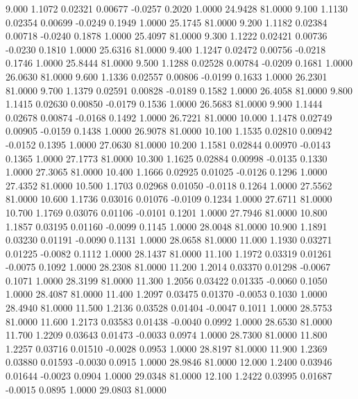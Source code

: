    9.000   1.1072   0.02321   0.00677  -0.0257   0.2020   1.0000  24.9428  81.0000
   9.100   1.1130   0.02354   0.00699  -0.0249   0.1949   1.0000  25.1745  81.0000
   9.200   1.1182   0.02384   0.00718  -0.0240   0.1878   1.0000  25.4097  81.0000
   9.300   1.1222   0.02421   0.00736  -0.0230   0.1810   1.0000  25.6316  81.0000
   9.400   1.1247   0.02472   0.00756  -0.0218   0.1746   1.0000  25.8444  81.0000
   9.500   1.1288   0.02528   0.00784  -0.0209   0.1681   1.0000  26.0630  81.0000
   9.600   1.1336   0.02557   0.00806  -0.0199   0.1633   1.0000  26.2301  81.0000
   9.700   1.1379   0.02591   0.00828  -0.0189   0.1582   1.0000  26.4058  81.0000
   9.800   1.1415   0.02630   0.00850  -0.0179   0.1536   1.0000  26.5683  81.0000
   9.900   1.1444   0.02678   0.00874  -0.0168   0.1492   1.0000  26.7221  81.0000
  10.000   1.1478   0.02749   0.00905  -0.0159   0.1438   1.0000  26.9078  81.0000
  10.100   1.1535   0.02810   0.00942  -0.0152   0.1395   1.0000  27.0630  81.0000
  10.200   1.1581   0.02844   0.00970  -0.0143   0.1365   1.0000  27.1773  81.0000
  10.300   1.1625   0.02884   0.00998  -0.0135   0.1330   1.0000  27.3065  81.0000
  10.400   1.1666   0.02925   0.01025  -0.0126   0.1296   1.0000  27.4352  81.0000
  10.500   1.1703   0.02968   0.01050  -0.0118   0.1264   1.0000  27.5562  81.0000
  10.600   1.1736   0.03016   0.01076  -0.0109   0.1234   1.0000  27.6711  81.0000
  10.700   1.1769   0.03076   0.01106  -0.0101   0.1201   1.0000  27.7946  81.0000
  10.800   1.1857   0.03195   0.01160  -0.0099   0.1145   1.0000  28.0048  81.0000
  10.900   1.1891   0.03230   0.01191  -0.0090   0.1131   1.0000  28.0658  81.0000
  11.000   1.1930   0.03271   0.01225  -0.0082   0.1112   1.0000  28.1437  81.0000
  11.100   1.1972   0.03319   0.01261  -0.0075   0.1092   1.0000  28.2308  81.0000
  11.200   1.2014   0.03370   0.01298  -0.0067   0.1071   1.0000  28.3199  81.0000
  11.300   1.2056   0.03422   0.01335  -0.0060   0.1050   1.0000  28.4087  81.0000
  11.400   1.2097   0.03475   0.01370  -0.0053   0.1030   1.0000  28.4940  81.0000
  11.500   1.2136   0.03528   0.01404  -0.0047   0.1011   1.0000  28.5753  81.0000
  11.600   1.2173   0.03583   0.01438  -0.0040   0.0992   1.0000  28.6530  81.0000
  11.700   1.2209   0.03643   0.01473  -0.0033   0.0974   1.0000  28.7300  81.0000
  11.800   1.2257   0.03716   0.01510  -0.0028   0.0953   1.0000  28.8197  81.0000
  11.900   1.2369   0.03880   0.01593  -0.0030   0.0915   1.0000  28.9846  81.0000
  12.000   1.2400   0.03946   0.01644  -0.0023   0.0904   1.0000  29.0348  81.0000
  12.100   1.2422   0.03995   0.01687  -0.0015   0.0895   1.0000  29.0803  81.0000
